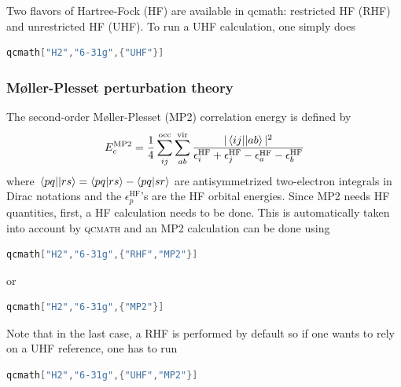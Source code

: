 \documentclass[aip,jcp,reprint,noshowkeys,superscriptaddress]{revtex4-1}
\newcommand{\EcMP}{E_c^{\text{MP2}}}
\newcommand{\eHF}[1]{\epsilon^\text{HF}_{#1}}
\newcommand{\qcmath}{\textsc{qcmath}\xspace}
\begin{document}
Two flavors of Hartree-Fock (HF) are available in qcmath: restricted HF (RHF) and unrestricted HF (UHF). To run a UHF calculation, one simply does
\begin{lstlisting}[extendedchars=true,language=Mathematica]
	qcmath["H2","6-31g",{"UHF"}]
\end{lstlisting}

\subsubsection*{M\o{}ller-Plesset perturbation theory}
The second-order M\o{}ller-Plesset (MP2) correlation energy is defined by 
\begin{equation}
	\EcMP = \frac{1}{4} \sum_{ij}^{\text{occ}} \sum_{ab}^{\text{vir}} \frac{ |\mel{ij}{}{ab}|^2 }{\eHF{i} + \eHF{j} - \eHF{a} - \eHF{b}}
\end{equation}
where $\mel{pq}{}{rs} = \braket{pq}{rs} - \braket{pq}{sr}$ are antisymmetrized two-electron integrals in Dirac notations and the $\eHF{p}$'s are the HF orbital energies.
Since MP2 needs HF quantities, first, a HF calculation needs to be done. This is automatically taken into account by \qcmath and an MP2 calculation can be done using 
\begin{lstlisting}[extendedchars=true,language=Mathematica]
	qcmath["H2","6-31g",{"RHF","MP2"}]
\end{lstlisting}
or 
\begin{lstlisting}[extendedchars=true,language=Mathematica]
	qcmath["H2","6-31g",{"MP2"}]
\end{lstlisting}
Note that in the last case, a RHF is performed by default so if one wants to rely on a UHF reference, one has to run
\begin{lstlisting}[extendedchars=true,language=Mathematica]
	qcmath["H2","6-31g",{"UHF","MP2"}]
\end{lstlisting}

\end{document}
